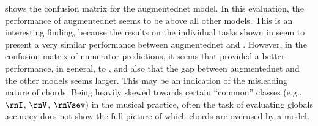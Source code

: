 

 shows the
confusion matrix for the \gls{augmentednet} model. In this
evaluation, the performance of \gls{augmentednet} seems to
be above all other models. This is an interesting finding,
because the results on the individual tasks shown in
 seem to present a very similar
performance between \gls{augmentednet} and
\textcite{micchi2021deep}. However, in the confusion matrix
of numerator predictions, it seems that
\textcite{mcleod2021modular} provided a better performance,
in general, to \textcite{micchi2021deep}, and also that the
gap between \gls{augmentednet} and the other models seems
larger. This may be an indication of the misleading nature
of chords. Being heavily skewed towards certain ``common''
classes (e.g., $\rnI$, $\rnV$, $\rnVsev$) in the musical
practice, often the task of evaluating globals accuracy does
not show the full picture of which chords are overused by a
model. 

